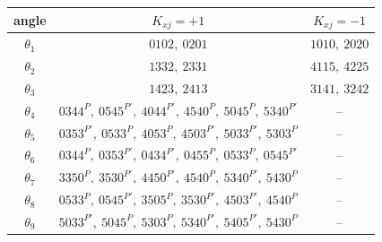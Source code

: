 \begin{center}\small\begin{tabular}{ccc}
\hline
angle & $K_{xj}=+1$ & $K_{xj}=-1$\\
\hline
$\theta_{1}$ & $0102,\ 0201$ & $1010,\ 2020$\\
$\theta_{2}$ & $1332,\ 2331$ & $4115,\ 4225$\\
$\theta_{3}$ & $1423,\ 2413$ & $3141,\ 3242$\\
$\theta_{4}$ & $0344^{\scriptscriptstyle P},\ 0545^{\scriptscriptstyle P'},\ 4044^{\scriptscriptstyle P'},\ 4540^{\scriptscriptstyle P},\ 5045^{\scriptscriptstyle P},\ 5340^{\scriptscriptstyle P'}$ & --\\
$\theta_{5}$ & $0353^{\scriptscriptstyle P'},\ 0533^{\scriptscriptstyle P},\ 4053^{\scriptscriptstyle P},\ 4503^{\scriptscriptstyle P'},\ 5033^{\scriptscriptstyle P'},\ 5303^{\scriptscriptstyle P}$ & --\\
$\theta_{6}$ & $0344^{\scriptscriptstyle P},\ 0353^{\scriptscriptstyle P'},\ 0434^{\scriptscriptstyle P'},\ 0455^{\scriptscriptstyle P},\ 0533^{\scriptscriptstyle P},\ 0545^{\scriptscriptstyle P'}$ & --\\
$\theta_{7}$ & $3350^{\scriptscriptstyle P},\ 3530^{\scriptscriptstyle P'},\ 4450^{\scriptscriptstyle P'},\ 4540^{\scriptscriptstyle P},\ 5340^{\scriptscriptstyle P'},\ 5430^{\scriptscriptstyle P}$ & --\\
$\theta_{8}$ & $0533^{\scriptscriptstyle P},\ 0545^{\scriptscriptstyle P'},\ 3505^{\scriptscriptstyle P},\ 3530^{\scriptscriptstyle P'},\ 4503^{\scriptscriptstyle P'},\ 4540^{\scriptscriptstyle P}$ & --\\
$\theta_{9}$ & $5033^{\scriptscriptstyle P'},\ 5045^{\scriptscriptstyle P},\ 5303^{\scriptscriptstyle P},\ 5340^{\scriptscriptstyle P'},\ 5405^{\scriptscriptstyle P'},\ 5430^{\scriptscriptstyle P}$ & --\\
\hline
\end{tabular}\end{center}
